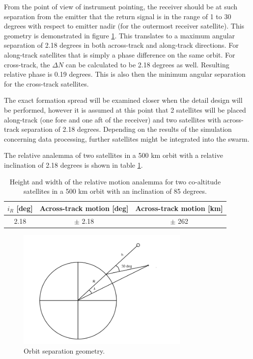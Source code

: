 From the point of view of instrument pointing, the receiver should be at such separation from the emitter that the return signal is in the range of 1 to 30 degrees with respect to emitter nadir (for the outermost receiver satellite). This geometry is demonstrated in figure \ref{fig:separation}. This translates to a maximum angular separation of 2.18 degrees in both across-track and along-track directions. For along-track satellites that is simply a phase difference on the same orbit. For cross-track, the $\Delta N$ can be calculated to be 2.18 degrees as well. Resulting relative phase is 0.19 degrees. This is also then the minimum angular separation for the cross-track satellites.

The exact formation spread will be examined closer when the detail design will be performed, however it is assumed at this point that 2 satellites will be placed along-track (one fore and one aft of the receiver) and two satellites with across-track separation of 2.18 degrees. Depending on the results of the simulation concerning data processing, further satellites might be integrated into the swarm.

The relative analemma of two satellites in a 500 km orbit with a relative inclination of 2.18 degrees is shown in table \ref{table:analemma}.

\begin{table}[ht]
	\centering
		\begin{tabular}{c |c | c }
		 $i_R$ [deg] & Across-track motion [deg] & Across-track motion [km] \\ \hline \hline
		 2.18 & $\pm$ 2.18 & $\pm$ 262 
		\end{tabular}
	\caption{Height and width of the relative motion analemma for two co-altitude satellites in a 500 km orbit with an inclination of 85 degrees.}
	\label{table:analemma}
\end{table}

\begin{figure}[!ht]
\centering
\includegraphics[width=0.75\textwidth, angle=0]{chapters/img/seperation.png}
\caption{Orbit separation geometry.}
\label{fig:separation}
\end{figure}

